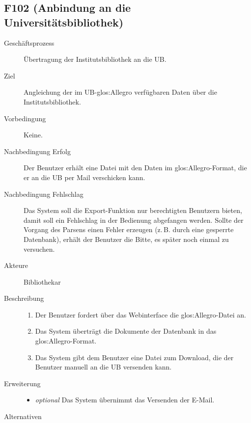 \subsection{F102 (Anbindung an die Universitätsbibliothek)}
\begin{description}
  \item[Geschäftsprozess]Übertragung der Institutsbibliothek an die \gls{UB}.
  \item[Ziel]Angleichung der im \gls{UB}-\gls{glos:Allegro} verfügbaren Daten über die Institutsbibliothek.
  \item[Vorbedingung]Keine.
  \item[Nachbedingung Erfolg]Der Benutzer erhält eine Datei mit den Daten im \gls{glos:Allegro}-Format, die er an die \gls{UB} per Mail verschicken kann.
  \item[Nachbedingung Fehlschlag]Das System soll die Export-Funktion nur berechtigten Benutzern bieten, damit soll ein Fehlschlag in der Bedienung abgefangen werden. Sollte der Vorgang des Parsens einen Fehler erzeugen (z.\,B. durch eine gesperrte Datenbank), erhält der Benutzer die Bitte, es später noch einmal zu versuchen.
  \item[Akteure]Bibliothekar
  \item[Beschreibung]\hfill
    \begin{enumerate}
      \item Der Benutzer fordert über das Webinterface die \gls{glos:Allegro}-Datei an.
      \item Das System überträgt die Dokumente der Datenbank in das \gls{glos:Allegro}-Format.
      \item Das System gibt dem Benutzer eine Datei zum Download, die der Benutzer manuell an die \gls{UB} versenden kann.
    \end{enumerate}
  \item[Erweiterung]\hfill
    \begin{itemize}
      \item \emph{optional} Das System übernimmt das Versenden der E-Mail.
    \end{itemize}
  \item[Alternativen]
\end{description}

